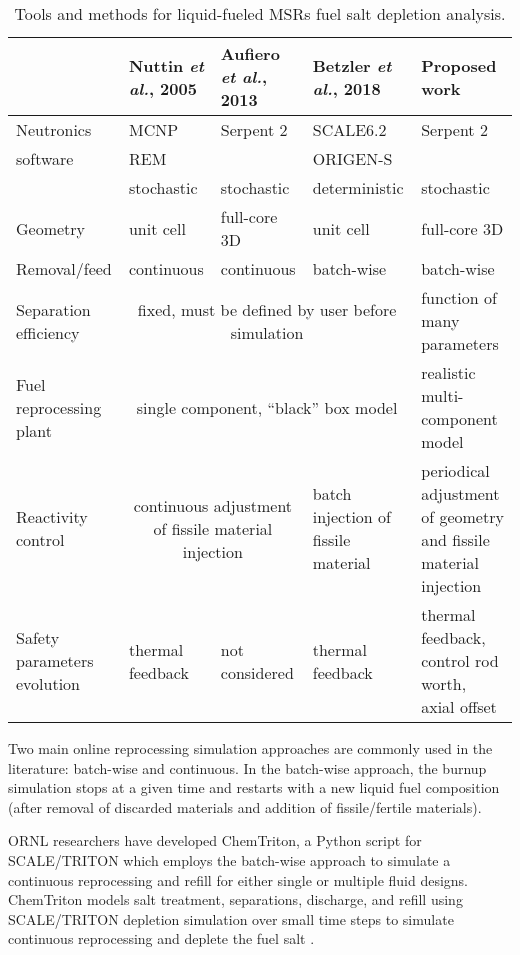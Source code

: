 \begin{table}[htbp]
	\fontsize{9}{11}\selectfont
	\caption{Tools and methods for liquid-fueled \glspl{MSR} fuel salt 
	depletion 
		analysis.}
	\begin{tabularx}{\textwidth}{p{} p{} 	
	p{} p{} p{}} 
	\hline
	&Nuttin \emph{et al.}, 2005 \cite{nuttin_potential_2005}& Aufiero 
	\emph{et al.}, 2013 \cite{aufiero_extended_2013} & Betzler \emph{et al.}, 
	2018 \cite{betzler_fuel_2018}&Proposed work \\
	\hline
	Neutronics&\gls{MCNP}&Serpent 2 &SCALE6.2     &Serpent 2 \\
	software  & REM      &          &ORIGEN-S     &			       \\
         	  &stochastic&stochastic&deterministic&stochastic      \\[10pt]
	Geometry  & unit cell& full-core 3D&unit cell&full-core 3D\\      [10pt]
	Removal/feed  & continuous &continuous & batch-wise & batch-wise\\[10pt]
	Separation efficiency &\multicolumn{3}{c}{fixed, must be defined by 
	user before simulation} & function of many para\-me\-ters \\ [10pt]
	Fuel reprocessing plant & \multicolumn{3}{c}{single component, 	``black'' 
	box model} & realistic multi-compo\-nent model \\ [10pt]
	Reactivity control & \multicolumn{2}{c}{continuous adjustment of fissile 
	material injection} & batch injection of fissile material & periodical 
		adjustment of geometry and fissile material injection\\ [10pt]
	Safety parameters evolution & thermal feedback & not considered & thermal 
	feedback & thermal feedback, control rod worth, axial offset \\
	\hline
	\end{tabularx}
	\label{tab:msr_codes}
\end{table}

Two main online reprocessing simulation approaches are commonly used in the 
literature: batch-wise and continuous. In the batch-wise approach, the burnup 
simulation stops at a given time and restarts with a new liquid fuel 
composition (after removal of discarded materials and addition of 
fissile/fertile materials). 

\gls{ORNL} researchers have developed ChemTriton, a Python script for
SCALE/TRITON which employs the batch-wise approach to simulate a continuous 
reprocessing and refill for either single or multiple fluid designs.  
ChemTriton models salt treatment, separations, discharge, and refill using  
SCALE/TRITON depletion simulation over small time steps to simulate continuous 
reprocessing and deplete the fuel salt \cite{betzler_fuel_2018, 
powers_new_2013}.

